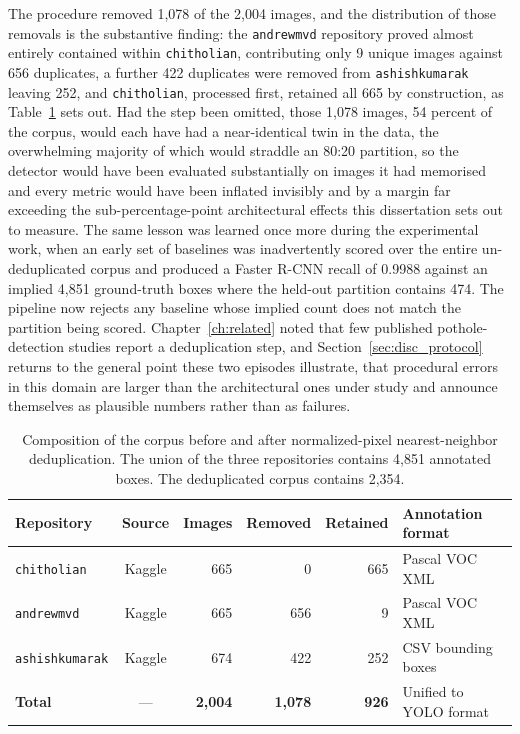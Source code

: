 \documentclass[MScCS]{uccthesis}
\begin{document}
The procedure removed 1,078 of the 2,004 images, and the distribution of those
removals is the substantive finding: the \texttt{andrewmvd} repository proved
almost entirely contained within \texttt{chitholian}, contributing only 9
unique images against 656 duplicates, a further 422 duplicates were removed
from \texttt{ashishkumarak} leaving 252, and \texttt{chitholian}, processed
first, retained all 665 by construction, as Table~\ref{tab:dataset} sets out.
Had the step been omitted, those 1,078 images, 54 percent of the corpus, would
each have had a near-identical twin in the data, the overwhelming majority of
which would straddle an 80:20 partition, so the detector would have been
evaluated substantially on images it had memorised and every metric would have
been inflated invisibly and by a margin far exceeding the sub-percentage-point
architectural effects this dissertation sets out to measure. The same lesson
was learned once more during the experimental work, when an early set of
baselines was inadvertently scored over the entire un-deduplicated corpus and
produced a Faster R-CNN recall of 0.9988 against an implied 4,851 ground-truth
boxes where the held-out partition contains 474. The pipeline now rejects any
baseline whose implied count does not match the partition being scored.
Chapter~\ref{ch:related} noted that few published pothole-detection studies
report a deduplication step, and Section~\ref{sec:disc_protocol} returns to the
general point these two episodes illustrate, that procedural errors in this
domain are larger than the architectural ones under study and announce
themselves as plausible numbers rather than as failures.

\begin{table}[tbp]
\centering
\small
\setlength{\tabcolsep}{4pt}
\begin{tabularx}{\textwidth}{@{}>{\RaggedRight\arraybackslash}X c rrr
   >{\RaggedRight\arraybackslash}X@{}}
\toprule
\textbf{Repository} & \textbf{Source} & \textbf{Images} & \textbf{Removed} &
\textbf{Retained} & \textbf{Annotation format} \\
\midrule
\texttt{chitholian}    & Kaggle & 665 & 0   & 665 & Pascal VOC XML \\
\texttt{andrewmvd}     & Kaggle & 665 & 656 & 9   & Pascal VOC XML \\
\texttt{ashishkumarak} & Kaggle & 674 & 422 & 252 & CSV bounding boxes \\
\midrule
\textbf{Total}         & ---    & \textbf{2{,}004} & \textbf{1{,}078} &
   \textbf{926} & Unified to YOLO format \\
\bottomrule
\end{tabularx}
\caption[Dataset composition before and after deduplication.]
        {\label{tab:dataset}Composition of the corpus before and after
         normalized-pixel nearest-neighbor deduplication. The union of the
         three repositories contains 4,851 annotated boxes. The deduplicated
         corpus contains 2,354.}
\end{table}
\end{document}
